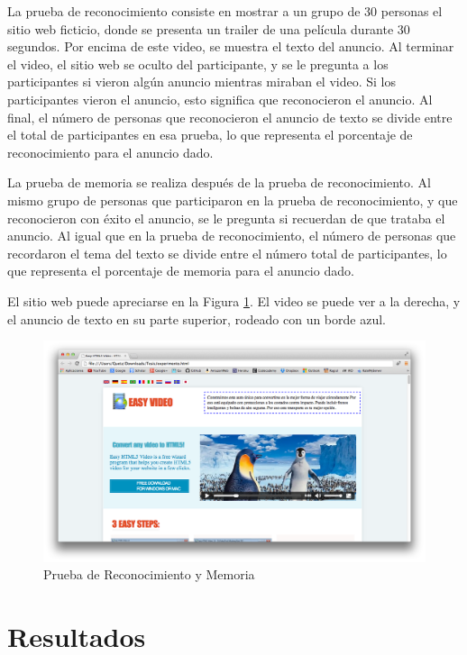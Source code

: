 La prueba de reconocimiento consiste en mostrar a un grupo de 30 personas el sitio web ficticio, donde se presenta un trailer de una película  durante 30 segundos. Por encima de este video, se muestra el texto del anuncio. Al terminar el video, el sitio web se oculto del participante, y se le pregunta a los participantes si vieron algún anuncio mientras miraban el video. Si los participantes vieron el anuncio, esto significa que reconocieron el anuncio. Al final, el número de personas que reconocieron el anuncio de texto se divide entre el total de participantes en esa prueba, lo que representa el porcentaje de reconocimiento para el anuncio dado. 

La prueba de memoria se realiza después de la prueba de reconocimiento. Al mismo grupo de personas que participaron en la prueba de reconocimiento, y que reconocieron con éxito el anuncio, se le pregunta si recuerdan de que trataba el anuncio. Al igual que en la prueba de reconocimiento, el número de personas que recordaron el tema del texto se divide entre el número total de participantes, lo que representa el porcentaje de memoria para el anuncio dado. 

El sitio web puede apreciarse en la Figura \ref{experimento}. El video se puede ver a la derecha, y el anuncio de texto en su parte superior, rodeado con un borde azul.

\begin{figure}[htp]
  \centerline{\includegraphics[width=7in]{experimento.png}} 
  \caption{Prueba de Reconocimiento y Memoria } 
\label{experimento}
\end{figure}

\clearpage
\section{Resultados}

